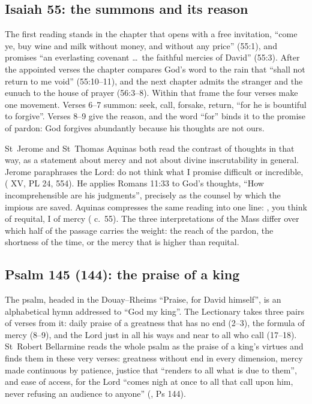 \subsection{Isaiah 55: the summons and its reason}

The first reading stands in the chapter that opens with a free invitation,
``come ye, buy wine and milk without money, and without any price'' (55:1),
and promises ``an everlasting covenant \ldots\ the faithful mercies of David''
(55:3). After the appointed verses the chapter compares God's word to the rain
that ``shall not return to me void'' (55:10--11), and the next chapter admits
the stranger and the eunuch to the house of prayer (56:3--8). Within that
frame the four verses make one movement. Verses 6--7 summon: seek, call,
forsake, return, ``for he is bountiful to forgive''. Verses 8--9 give the
reason, and the word ``for'' binds it to the promise of pardon: God forgives
abundantly because his thoughts are not ours.

St~Jerome and St~Thomas Aquinas both read the contrast of thoughts in that
way, as a statement about mercy and not about divine inscrutability in
general. Jerome paraphrases the Lord: do not think what I promise difficult or
incredible,  ( XV, PL
24, 554). He applies Romans 11:33 to God's thoughts, ``How incomprehensible are
his judgments'', precisely as the counsel by which the impious are saved.
Aquinas compresses the same reading into one line: , you think of requital, I of mercy
( c.~55). The three interpretations of the Mass differ over which half of the
passage carries the weight: the reach of the pardon, the shortness of the time,
or the mercy that is higher than requital.

\subsection{Psalm 145 (144): the praise of a king}

The psalm, headed in the Douay--Rheims ``Praise, for David himself'', is an
alphabetical hymn addressed to ``God my king''. The Lectionary takes three
pairs of verses from it: daily praise of a greatness that has no end (2--3),
the formula of mercy (8--9), and the Lord just in all his ways and near to all
who call (17--18). St~Robert
Bellarmine reads the whole psalm as the praise of a king's virtues and finds
them in these very verses: greatness without end in every dimension, mercy
made continuous by patience, justice that ``renders to all what is due to
them'', and ease of access, for the Lord ``comes nigh at once to all that call
upon him, never refusing an audience to anyone'' (, Ps 144).

